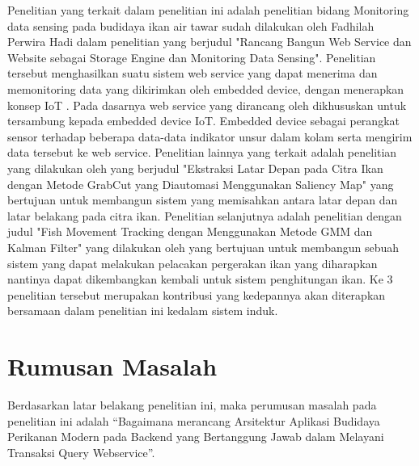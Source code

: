 Penelitian yang terkait dalam penelitian ini adalah penelitian bidang Monitoring data sensing pada budidaya ikan air tawar sudah dilakukan oleh Fadhilah Perwira Hadi dalam penelitian yang berjudul "Rancang Bangun Web Service dan Website sebagai Storage Engine dan Monitoring Data Sensing". Penelitian tersebut menghasilkan suatu sistem web service yang dapat menerima dan memonitoring data yang dikirimkan oleh embedded device, dengan menerapkan konsep IoT \citep{fadhilah2021skripsi}. Pada dasarnya web service yang dirancang oleh \citep{fadhilah2021skripsi} dikhususkan untuk tersambung kepada embedded device IoT. Embedded device sebagai perangkat sensor terhadap beberapa data-data indikator unsur dalam kolam serta mengirim data tersebut ke web service. Penelitian lainnya yang terkait adalah penelitian yang dilakukan oleh \citep{nugraha2022ekstrasiLatarDepan} yang berjudul "Ekstraksi Latar Depan pada Citra Ikan dengan Metode GrabCut yang Diautomasi Menggunakan Saliency Map" yang bertujuan untuk membangun sistem yang memisahkan antara latar depan dan latar belakang pada citra ikan. Penelitian selanjutnya adalah penelitian dengan judul "Fish Movement Tracking dengan Menggunakan Metode GMM dan Kalman Filter" yang dilakukan oleh \citep{alim2022fishmovement} yang bertujuan untuk membangun sebuah sistem yang dapat melakukan pelacakan pergerakan ikan yang diharapkan nantinya dapat dikembangkan kembali untuk sistem penghitungan ikan. Ke 3 penelitian tersebut merupakan kontribusi yang kedepannya akan diterapkan bersamaan dalam penelitian ini kedalam sistem induk.



\section{Rumusan Masalah}
Berdasarkan latar belakang penelitian ini, maka perumusan masalah pada penelitian ini adalah “Bagaimana merancang Arsitektur Aplikasi Budidaya Perikanan Modern pada Backend yang Bertanggung Jawab dalam Melayani Transaksi Query Webservice”.

